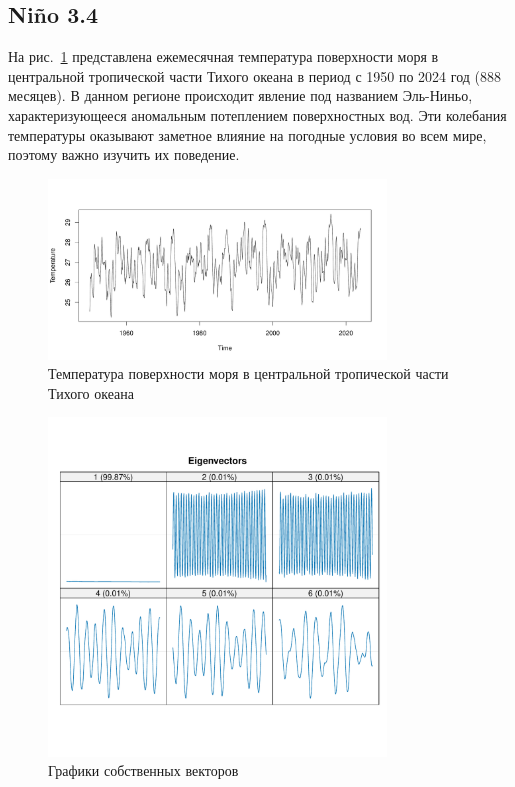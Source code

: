 \documentclass[specialist,
substylefile = spbu_report.rtx,
subf,href,colorlinks=true, 12pt]{disser}
\theoremstyle{definition}
\begin{document}
\subsection{Ni\~no 3.4}
На рис.~\ref{Nino_ts} представлена ежемесячная температура поверхности моря в центральной тропической части Тихого океана в период с 1950 по 2024 год ($888$ месяцев). В данном регионе происходит явление под названием Эль-Ниньо, характеризующееся аномальным потеплением поверхностных вод. Эти колебания температуры оказывают заметное влияние на погодные условия во всем мире, поэтому важно изучить их поведение.
\begin{figure}[h!]
	\centering
	\includegraphics[width=0.8\textwidth]{img/Nino_ts.pdf}
	\caption{Температура поверхности моря в центральной тропической части Тихого океана}
	\label{Nino_ts}	
\end{figure}
\begin{figure}[h!]
	\centering
	\includegraphics[width=0.8\textwidth]{img/Nino_ssa_vectors.pdf}
	\caption{Графики собственных векторов}
	\label{Nino_ssa_vectors}	
\end{figure}
\end{document}
